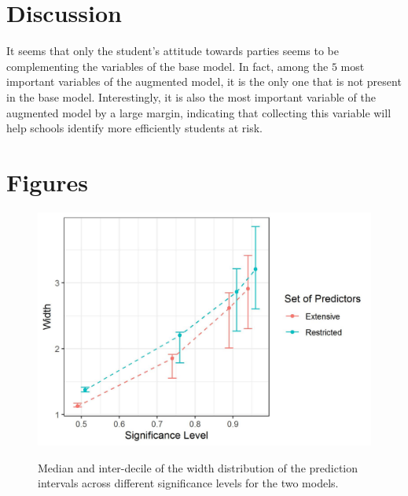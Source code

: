 \documentclass[10pt]{jmlr}%
\begin{document}
\section{Discussion}
\label{sec:conclusion}

It seems that only the student's attitude towards parties seems to be complementing the variables of the base model. In fact, among the $5$ most important variables of the augmented model, it is the only one that is not present in the base model. Interestingly, it is also the most important variable of the augmented model by a large margin, indicating that collecting this variable will help schools identify more efficiently students at risk.



\newpage
\appendix

\section{Figures}



\begin{figure}[htbp]
	\centering
	\caption{Median and inter-decile of the width distribution of the prediction intervals across different significance levels for the two models.}
	\includegraphics[width=0.9\linewidth]{conformal.jpeg}
	\label{fig:conformal}
\end{figure}




\end{document}
